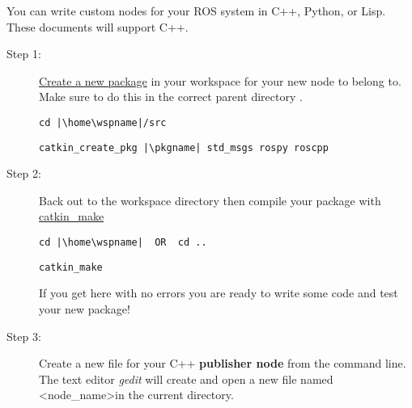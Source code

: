 \documentclass[12pt]{article}
\newcommand{\R}{\color{red}}
\newcommand{\K}{\color{black}}
\newcommand{\G}{\color{mygreen}}
\newcommand{\PR}{\color{mypurple}}
\newcommand{\pkgname}{\G<package\_name>\K}
\newcommand{\wspname}{\R<workspace\_name>\K}
\newcommand{\nodname}{\PR<node\_name>\K}
\newcommand{\home}{\textasciitilde/}
\begin{document}
\begin{description}[labelindent=1cm]
	\newpage
	\item[\textbf{\underline{Part II - Create A \href{http://wiki.ros.org/ROS/Tutorials/WritingPublisherSubscriber(c++)}{{\bf Publisher }}Node:}}] \hfill \vspace{0mm}
	   
	   You can write custom nodes for your ROS system in C++, Python, or Lisp. These documents will support C++.
	         \begin{description}    				
	          \item [Step 1:] \href{http://wiki.ros.org/ROS/Tutorials/CreatingPackage}{Create a new package} in your workspace for your new node to belong to. Make sure to do this in the correct parent directory .
	\begin{verbatim} 
cd |\home\wspname|/src
	\end{verbatim}
	
	\begin{verbatim} 
catkin_create_pkg |\pkgname| std_msgs rospy roscpp
	\end{verbatim}
	            
	            
	\item [Step 2:] Back out to the workspace directory then compile your package with \href{http://wiki.ros.org/catkin/Tutorials/using_a_workspace#Building_Packages_in_a_catkin_Workspace}{catkin\_make} 
	
	\begin{verbatim}  
cd |\home\wspname| 	OR 	cd ..
	\end{verbatim}
	             
	\begin{verbatim}  
catkin_make
	\end{verbatim}
	            
	
	If you get here with no errors you are ready to write some code and test your new package!
	            
	            
	\newpage
	\item [Step 3:] Create a new file for your C++ {\bf publisher node} from the command line. The text editor {\it gedit} will create and open a new file named \nodname in the current directory.
	
	

\end{description}
\end{description}
\end{document}
